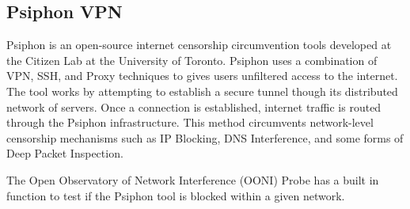 \subsection{Psiphon VPN}

Psiphon is an open-source internet censorship circumvention tools developed at the Citizen Lab at the University of Toronto. Psiphon uses a combination of VPN, SSH, and Proxy techniques to gives users unfiltered access to the internet. The tool works by attempting to establish a secure tunnel though its distributed network of servers. Once a connection is established, internet traffic is routed through the Psiphon infrastructure. This method circumvents network-level censorship mechanisms such as IP Blocking, DNS Interference, and some forms of Deep Packet Inspection. 

The Open Observatory of Network Interference (OONI) Probe has a built in function to test if the Psiphon tool is blocked within a given network.